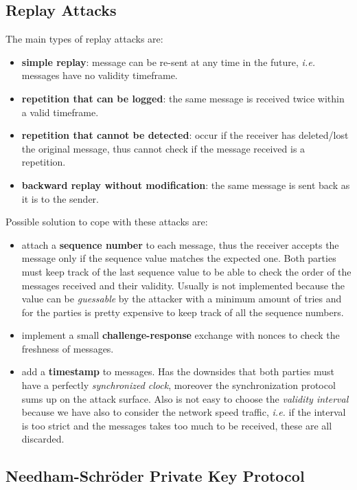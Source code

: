 \documentclass[oneside]{academica}
\begin{document}
\subsection{Replay Attacks}

The main types of replay attacks are:
\begin{itemize}
  \item \textbf{simple replay}: message can be re-sent at any time in the future, \textit{i.e.} messages have no validity timeframe.
  \item \textbf{repetition that can be logged}: the same message is received twice within a valid timeframe.
  \item \textbf{repetition that cannot be detected}: occur if the receiver has deleted/lost the original message, thus cannot check if the message received is a repetition.
  \item \textbf{backward replay without modification}: the same message is sent back as it is to the sender.
\end{itemize}

Possible solution to cope with these attacks are:
\begin{itemize}
  \item attach a \textbf{sequence number} to each message, thus the receiver accepts the message only if the sequence value matches the expected one. Both parties must keep track of the last sequence value to be able to check the order of the messages received and their validity. Usually is not implemented because the value can be \textit{guessable} by the attacker with a minimum amount of tries and for the parties is pretty expensive to keep track of all the sequence numbers.
  \item implement a small \textbf{challenge-response} exchange with nonces to check the freshness of messages.
  \item add a \textbf{timestamp} to messages. Has the downsides that both parties must have a perfectly \textit{synchronized clock}, moreover the synchronization protocol sums up on the attack surface. Also is not easy to choose the \textit{validity interval} because we have also to consider the network speed traffic, \textit{i.e.} if the interval is too strict and the messages takes too much to be received, these are all discarded.
\end{itemize}

\subsection{Needham-Schr\"{o}der Private Key Protocol}
\end{document}

